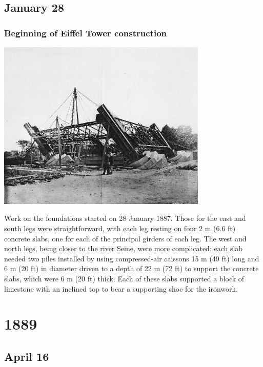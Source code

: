 \documentclass[11pt]{report}
\begin{document}
\section{January 28}
\subsection{Beginning of Eiffel Tower construction}
\vspace{2mm}\begin{center}\includegraphics[width=10cm]{./img/eiffelTowerConstruction.jpg}\end{center}
Work on the foundations started on 28 January 1887. Those for the east and south legs were straightforward, with each leg resting on four 2 m (6.6 ft) concrete slabs, one for each of the principal girders of each leg. The west and north legs, being closer to the river Seine, were more complicated: each slab needed two piles installed by using compressed-air caissons 15 m (49 ft) long and 6 m (20 ft) in diameter driven to a depth of 22 m (72 ft) to support the concrete slabs, which were 6 m (20 ft) thick. Each of these slabs supported a block of limestone with an inclined top to bear a supporting shoe for the ironwork.

\chapter{1889}
\section{April 16}
\end{document}
